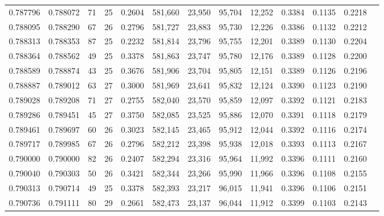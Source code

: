 \begin{tabular}{rrrrrrrrrrrrr}
0.787796 & 0.788072 &     71 &    25 &                                     0.2604 & 581,660 &  23,950 &  95,704 &  12,252 & 0.3384 & 0.1135 & 0.2218 \\
0.788095 & 0.788290 &     67 &    26 &                                     0.2796 & 581,727 &  23,883 &  95,730 &  12,226 & 0.3386 & 0.1132 & 0.2212 \\
0.788313 & 0.788353 &     87 &    25 &                                     0.2232 & 581,814 &  23,796 &  95,755 &  12,201 & 0.3389 & 0.1130 & 0.2204 \\
0.788364 & 0.788562 &     49 &    25 &                                     0.3378 & 581,863 &  23,747 &  95,780 &  12,176 & 0.3389 & 0.1128 & 0.2200 \\
0.788589 & 0.788874 &     43 &    25 &                                     0.3676 & 581,906 &  23,704 &  95,805 &  12,151 & 0.3389 & 0.1126 & 0.2196 \\
0.788887 & 0.789012 &     63 &    27 &                                     0.3000 & 581,969 &  23,641 &  95,832 &  12,124 & 0.3390 & 0.1123 & 0.2190 \\
0.789028 & 0.789208 &     71 &    27 &                                     0.2755 & 582,040 &  23,570 &  95,859 &  12,097 & 0.3392 & 0.1121 & 0.2183 \\
0.789286 & 0.789451 &     45 &    27 &                                     0.3750 & 582,085 &  23,525 &  95,886 &  12,070 & 0.3391 & 0.1118 & 0.2179 \\
0.789461 & 0.789697 &     60 &    26 &                                     0.3023 & 582,145 &  23,465 &  95,912 &  12,044 & 0.3392 & 0.1116 & 0.2174 \\
0.789717 & 0.789985 &     67 &    26 &                                     0.2796 & 582,212 &  23,398 &  95,938 &  12,018 & 0.3393 & 0.1113 & 0.2167 \\
0.790000 & 0.790000 &     82 &    26 &                                     0.2407 & 582,294 &  23,316 &  95,964 &  11,992 & 0.3396 & 0.1111 & 0.2160 \\
0.790040 & 0.790303 &     50 &    26 &                                     0.3421 & 582,344 &  23,266 &  95,990 &  11,966 & 0.3396 & 0.1108 & 0.2155 \\
0.790313 & 0.790714 &     49 &    25 &                                     0.3378 & 582,393 &  23,217 &  96,015 &  11,941 & 0.3396 & 0.1106 & 0.2151 \\
0.790736 & 0.791111 &     80 &    29 &                                     0.2661 & 582,473 &  23,137 &  96,044 &  11,912 & 0.3399 & 0.1103 & 0.2143 \\

\end{tabular}
